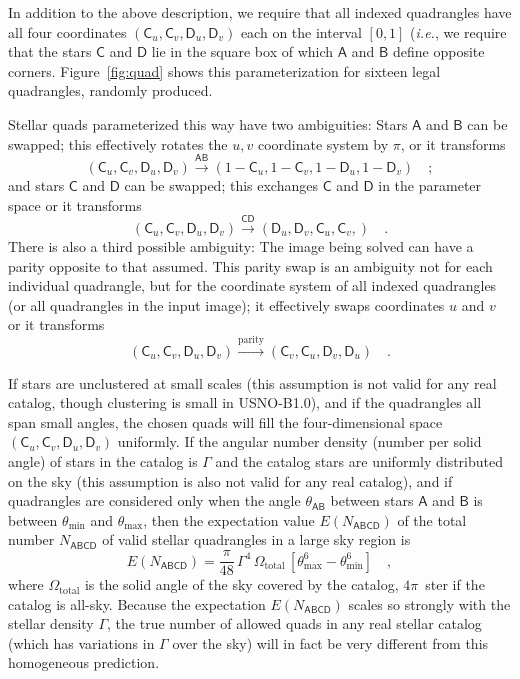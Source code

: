 \documentclass[12pt,preprint]{aastex}
\newcommand{\latin}[1]{\textit{#1}}
\newcommand{\ie}{\latin{i.e.}}
\newcommand{\usnob}{USNO-B1.0}
\newcommand{\starlabel}[1]{\mathsf{#1}}
\newcommand{\AAA}{\starlabel{A}}
\newcommand{\BBB}{\starlabel{B}}
\newcommand{\CCC}{\starlabel{C}}
\newcommand{\DDD}{\starlabel{D}}
\newcommand{\NABCD}{N_{\AAA\BBB\CCC\DDD}}
\newcommand{\ENABCD}{E(\NABCD)}
\newcommand{\thetaAB}{\theta_{\AAA\BBB}}
\newcommand{\thetamin}{\theta_\mathrm{min}}
\newcommand{\thetamax}{\theta_\mathrm{max}}
\begin{document}
In addition to the above description, we require that all indexed
quadrangles have all four coordinates $(\CCC_u,\CCC_v,\DDD_u,\DDD_v)$
each on the interval $[0,1]$ (\ie, we require that the stars $\CCC$
and $\DDD$ lie in the square box of which $\AAA$ and $\BBB$ define
opposite corners.  Figure~\ref{fig:quad} shows this parameterization
for sixteen legal quadrangles, randomly produced.

Stellar quads parameterized this way have two ambiguities:  Stars
$\AAA$ and $\BBB$ can be swapped; this effectively rotates the $u,v$
coordinate system by $\pi$, or it transforms
\begin{equation}
(\CCC_u,\CCC_v,\DDD_u,\DDD_v) \stackrel{\AAA\BBB}{\rightarrow}
  (1-\CCC_u,1-\CCC_v,1-\DDD_u,1-\DDD_v) \quad ;
\end{equation}
and stars $\CCC$ and $\DDD$ can be swapped; this exchanges $\CCC$ and
$\DDD$ in the parameter space or it transforms
\begin{equation}
(\CCC_u,\CCC_v,\DDD_u,\DDD_v) \stackrel{\CCC\DDD}{\rightarrow}
  (\DDD_u,\DDD_v,\CCC_u,\CCC_v,) \quad .
\end{equation}
There is also a third possible ambiguity: The image being solved can
have a parity opposite to that assumed.  This parity swap is an
ambiguity not for each individual quadrangle, but for the coordinate
system of all indexed quadrangles (or all quadrangles in the input
image); it effectively swaps coordinates $u$ and $v$ or it transforms
\begin{equation}
(\CCC_u,\CCC_v,\DDD_u,\DDD_v) \stackrel{\mathrm{parity}}{\rightarrow}
  (\CCC_v,\CCC_u,\DDD_v,\DDD_u) \quad .
\end{equation}

If stars are unclustered at small scales (this assumption is not valid
for any real catalog, though clustering is small in \usnob), and if
the quadrangles all span small angles, the chosen quads will fill the
four-dimensional space $(\CCC_u,\CCC_v,\DDD_u,\DDD_v)$ uniformly.  If
the angular number density (number per solid angle) of stars in the
catalog is $\Gamma$ and the catalog stars are uniformly distributed on
the sky (this assumption is also not valid for any real catalog), and
if quadrangles are considered only when the angle $\thetaAB$ between
stars $\AAA$ and $\BBB$ is between $\thetamin$ and $\thetamax$, then
the expectation value $\ENABCD$ of the total number $\NABCD$ of valid
stellar quadrangles in a large sky region is
\begin{equation}
\ENABCD = \frac{\pi}{48}\,\Gamma^4\,\Omega_\mathrm{total}\,
  [\thetamax^6-\thetamin^6] \quad ,
\end{equation}
where $\Omega_\mathrm{total}$ is the solid angle of the sky covered by
the catalog, $4\pi$~ster if the catalog is all-sky.  Because the
expectation $\ENABCD$ scales so strongly with the stellar density
$\Gamma$, the true number of allowed quads in any real stellar catalog
(which has variations in $\Gamma$ over the sky) will in fact be very
different from this homogeneous prediction.
\end{document}
